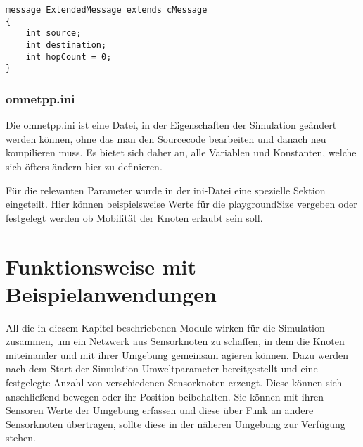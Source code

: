 \begin{lstlisting}[language=ned,caption={ExtendedMessage},label=lst:ExtendedMessage]
message ExtendedMessage extends cMessage
{
    int source;
    int destination;
    int hopCount = 0;    
}
\end{lstlisting}

\subsubsection{omnetpp.ini}

Die omnetpp.ini ist eine Datei, in der Eigenschaften der Simulation geändert werden können, ohne das man den Sourcecode bearbeiten und danach neu kompilieren muss. Es bietet sich daher an, alle Variablen und Konstanten, welche sich öfters ändern hier zu definieren.\newline



Für die relevanten Parameter wurde in der ini-Datei eine spezielle Sektion eingeteilt. Hier können beispielsweise Werte für die playgroundSize vergeben oder festgelegt werden ob Mobilität der Knoten erlaubt sein soll.

\section{Funktionsweise mit Beispielanwendungen}

All die in diesem Kapitel beschriebenen Module wirken für die Simulation zusammen, um ein Netzwerk aus Sensorknoten zu schaffen, in dem die Knoten miteinander und mit ihrer Umgebung gemeinsam agieren können. Dazu werden nach dem Start der Simulation Umweltparameter bereitgestellt und eine festgelegte Anzahl von verschiedenen Sensorknoten erzeugt. Diese können sich anschließend bewegen oder ihr Position beibehalten. Sie können mit ihren Sensoren Werte der Umgebung erfassen und diese über Funk an andere Sensorknoten übertragen, sollte diese in der näheren Umgebung zur Verfügung stehen.
